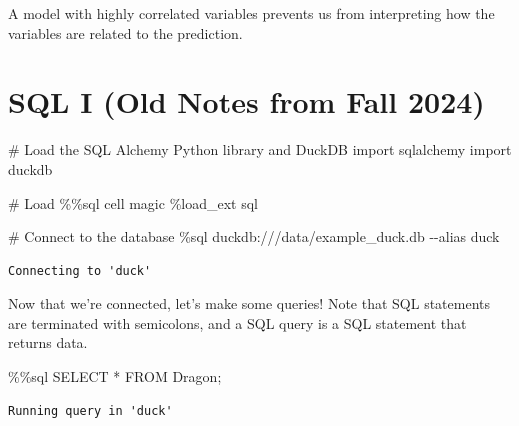 \documentclass[
  letterpaper,
  DIV=11,
  numbers=noendperiod]{scrreprt}
\newenvironment{Shaded}{\begin{snugshade}}{\end{snugshade}}
\newcommand{\CommentTok}[1]{\textcolor[rgb]{0.37,0.37,0.37}{#1}}
\newcommand{\ImportTok}[1]{\textcolor[rgb]{0.00,0.46,0.62}{#1}}
\newcommand{\NormalTok}[1]{\textcolor[rgb]{0.00,0.23,0.31}{#1}}
\newcommand{\OperatorTok}[1]{\textcolor[rgb]{0.37,0.37,0.37}{#1}}
\begin{document}
A model with highly correlated variables prevents us from interpreting
how the variables are related to the prediction.


\chapter{SQL I (Old Notes from Fall
2024)}\label{sql-i-old-notes-from-fall-2024}

\begin{Shaded}
\begin{Highlighting}[]
\CommentTok{\# Load the SQL Alchemy Python library and DuckDB}
\ImportTok{import}\NormalTok{ sqlalchemy}
\ImportTok{import}\NormalTok{ duckdb}
\end{Highlighting}
\end{Shaded}

\begin{Shaded}
\begin{Highlighting}[]
\CommentTok{\# Load \%\%sql cell magic}
\OperatorTok{\%}\NormalTok{load\_ext sql}
\end{Highlighting}
\end{Shaded}

\begin{Shaded}
\begin{Highlighting}[]
\CommentTok{\# Connect to the database}
\OperatorTok{\%}\NormalTok{sql duckdb:}\OperatorTok{///}\NormalTok{data}\OperatorTok{/}\NormalTok{example\_duck.db }\OperatorTok{{-}{-}}\NormalTok{alias duck}
\end{Highlighting}
\end{Shaded}

\begin{verbatim}
Connecting to 'duck'
\end{verbatim}

Now that we're connected, let's make some queries! Note that SQL
statements are terminated with semicolons, and a SQL query is a SQL
statement that returns data.

\begin{Shaded}
\begin{Highlighting}[]
\OperatorTok{\%\%}\NormalTok{sql}
\NormalTok{SELECT }\OperatorTok{*}\NormalTok{ FROM Dragon}\OperatorTok{;}
\end{Highlighting}
\end{Shaded}

\begin{verbatim}
Running query in 'duck'
\end{verbatim}
\end{document}
